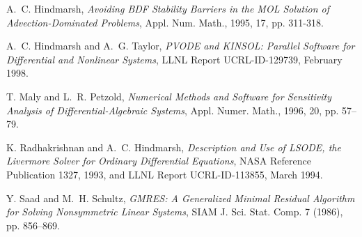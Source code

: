 \begin{thebibliography}{99}
A.~C. Hindmarsh, {\em Avoiding BDF Stability Barriers in the MOL
Solution of Advection-Dominated Problems},
Appl. Num. Math., 1995, 17, pp. 311-318.

A.~C. Hindmarsh and A.~G. Taylor, {\em PVODE and KINSOL: Parallel Software
for Differential and Nonlinear Systems}, LLNL Report UCRL-ID-129739, February 1998.

T. Maly and L.~R. Petzold, {\em Numerical Methods and Software for Sensitivity
Analysis of Differential-Algebraic Systems}, Appl. Numer. Math., 1996, 20, pp. 57--79.

K. Radhakrishnan and A.~C. Hindmarsh, {\em Description and Use
of LSODE, the Livermore Solver for Ordinary Differential Equations},
NASA Reference Publication 1327, 1993, and LLNL Report UCRL-ID-113855, March
1994.

Y. Saad and M.~H. Schultz, {\em GMRES: A Generalized Minimal Residual
Algorithm for Solving Nonsymmetric Linear Systems}, SIAM J. Sci. Stat.
Comp. 7 (1986), pp. 856--869.

\end{thebibliography}
